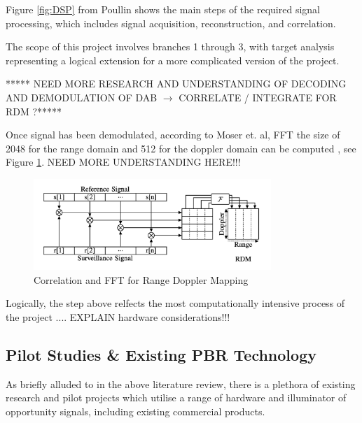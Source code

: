 \documentclass[12pt,a4paper]{article}
\begin{document}
\par \vspace{0.5cm} 
\noindent Figure \ref{fig:DSP} from Poullin \cite{detectionDABmodulation} shows the main steps of the required signal processing, which includes signal acquisition, reconstruction, and correlation. 

\par \vspace{3.5cm} 
\noindent The scope of this project involves branches 1 through 3, with target analysis representing a logical extension for a more complicated version of the project. 
\par \vspace{0.5cm} 
\noindent ****** NEED MORE RESEARCH AND UNDERSTANDING OF DECODING AND DEMODULATION OF DAB \(\rightarrow\) CORRELATE / INTEGRATE FOR RDM ?*****
\par \vspace{0.5cm} 
\noindent Once signal has been demodulated, according to Moser et. al, FFT the size of 2048 for the range domain and 512 for the doppler domain can be computed \cite{IOTpassiveRadar}, see Figure \ref{fig:FFT}. NEED MORE UNDERSTANDING HERE!!!
\begin{figure}[htbp]
    \centering
    \includegraphics[width=0.8\textwidth]{FFT.png}
    \caption{Correlation and FFT for Range Doppler Mapping \cite{IOTpassiveRadar}}
    \label{fig:FFT}
\end{figure}
\par \vspace{0.5cm} 
\noindent Logically, the step above relfects the most computationally intensive process of the project .... EXPLAIN hardware considerations!!!

\subsection{Pilot Studies \& Existing PBR Technology}
As briefly alluded to in the above literature review, there is a plethora of existing research and pilot projects which utilise a range of hardware and illuminator of opportunity signals, including existing commercial products.
\end{document}

